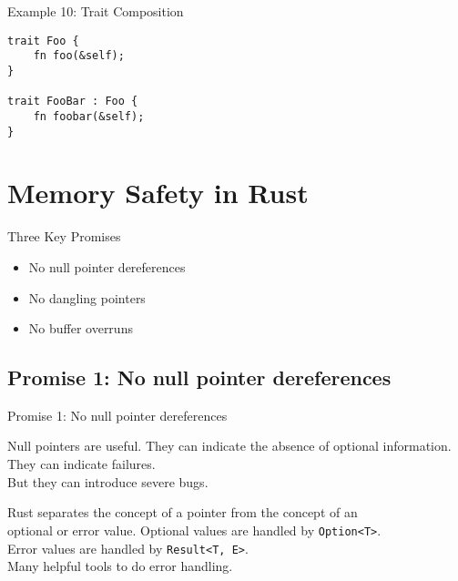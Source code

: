 \documentclass[aspectratio=1610,t]{beamer}
\begin{document}

\begin{frame}[fragile]{Example 10: Trait Composition}
\begin{verbatim}
trait Foo {
    fn foo(&self);
}

trait FooBar : Foo {
    fn foobar(&self);
}
\end{verbatim}
\end{frame}


\section{Memory Safety in Rust}


\begin{frame}{Three Key Promises}

\begin{itemize}
	\item No null pointer dereferences
	\pause
	\item No dangling pointers
	\pause
	\item No buffer overruns
\end{itemize}

\end{frame}


\subsection{Promise 1: No null pointer dereferences}


\begin{frame}{Promise 1: No null pointer dereferences}

\begin{block}{Null pointers are useful.}
They can indicate the absence of optional information.\\
They can indicate failures.\\
\pause
But they can introduce severe bugs.
\end{block}
\vspace{1em}
\pause
\begin{block}{Rust separates the concept of a pointer from the concept of an\\
		optional or error value.}
	Optional values are handled by \texttt{Option<T>}.\\
  Error values are handled by \texttt{Result<T, E>}.\\
	Many helpful tools to do error handling.
\end{block}

\end{frame}
\end{document}
